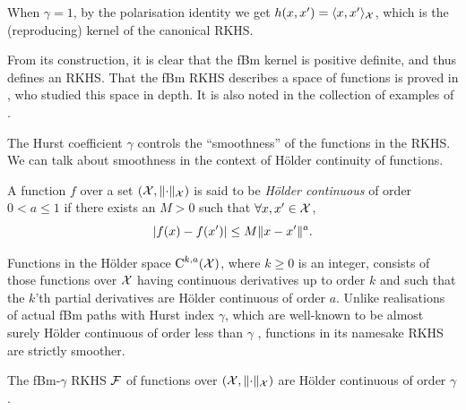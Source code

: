 \begin{remark}
  When $\gamma=1$, by the polarisation identity we get $h(x,x') = \langle x,x'\rangle_{\mathcal X}$, which is the (reproducing) kernel of the canonical RKHS.
\end{remark}

From its construction, it is clear that the fBm kernel is positive definite, and thus defines an RKHS.
That the fBm RKHS describes a space of functions is proved in \citet{cohen2002}, who studied this space in depth. 
It is also noted in the collection of examples of \citet[Sec 3.3, E.g. 3, p. 71 \& Sec 7.4, E.g. 20, p. 319]{berlinet2011reproducing}.

The Hurst coefficient $\gamma$ controls the ``smoothness'' of the functions in the RKHS. 
We can talk about smoothness in the context of Hölder continuity of functions.

\begin{definition}
  A function $f$ over a set $({\mathcal X}, \lVert\cdot\rVert_{\mathcal X})$ is said to be \emph{Hölder continuous} of order $0 <a\leq 1$ if there exists an $M>0$ such that $\forall x,x'\in{\mathcal X}$,
  \[
    \vert f(x) - f(x') \vert \leq M \lVert x-x'\rVert^a.
  \]
\end{definition}

Functions in the Hölder space $\text{C}^{k,a}({\mathcal X})$, where $k\geq 0$ is an integer, consists of those functions over ${\mathcal X}$ having continuous derivatives up to order $k$ and such that the $k$'th partial derivatives are Hölder continuous of order $a$.
Unlike realisations of actual fBm paths with Hurst index $\gamma$, which are well-known to be almost surely Hölder continuous of order less than $\gamma$ \citep[Thm. 4.1.1]{embrechts2002selfsimilar}, functions in its namesake RKHS are strictly smoother.

\begin{proposition}
  The fBm-$\gamma$ RKHS ${\mathcal F}$ of functions over $({\mathcal X}, \lVert\cdot\rVert_{\mathcal X})$ are Hölder continuous of order $\gamma$.
\end{proposition}

